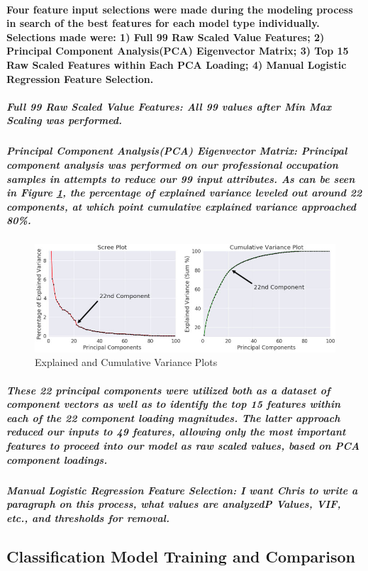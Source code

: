 \documentclass{article}
\begin{document}
\paragraph{Four feature input selections were made during the modeling process in search of the best features for each model type individually. Selections made were: 1) Full 99 Raw Scaled Value Features; 2) Principal Component Analysis(PCA) Eigenvector Matrix; 3) Top 15 Raw Scaled Features within Each PCA Loading; 4) Manual Logistic Regression Feature Selection.}

\subparagraph{Full 99 Raw Scaled Value Features: All 99 values after Min Max Scaling was performed.}

\subparagraph{Principal Component Analysis(PCA) Eigenvector Matrix: Principal component analysis was performed on our professional occupation samples in attempts to reduce our 99 input attributes. As can be seen in Figure \ref{fig:PCA_Scree_CumVar}, the percentage of explained variance leveled out around 22 components, at which point cumulative explained variance approached 80\%.}

\subparagraph{}
\begin{figure}[H]
\centering
\includegraphics[width=\linewidth]{PCA_Scree_CumVar.jpg}
\caption{Explained and Cumulative Variance Plots}
\label{fig:PCA_Scree_CumVar}
\end{figure}


\subparagraph{These 22 principal components were utilized both as a dataset of component vectors as well as to identify the top 15 features within each of the 22 component loading magnitudes. The latter approach reduced our inputs to 49 features, allowing only the most important features to proceed into our model as raw scaled values, based on PCA component loadings.}

\subparagraph{Manual Logistic Regression Feature Selection: I want Chris to write a paragraph on this process, what values are analyzed{P Values, VIF, etc.}, and thresholds for removal.}
 

\subsection{Classification Model Training and Comparison}
\end{document}
